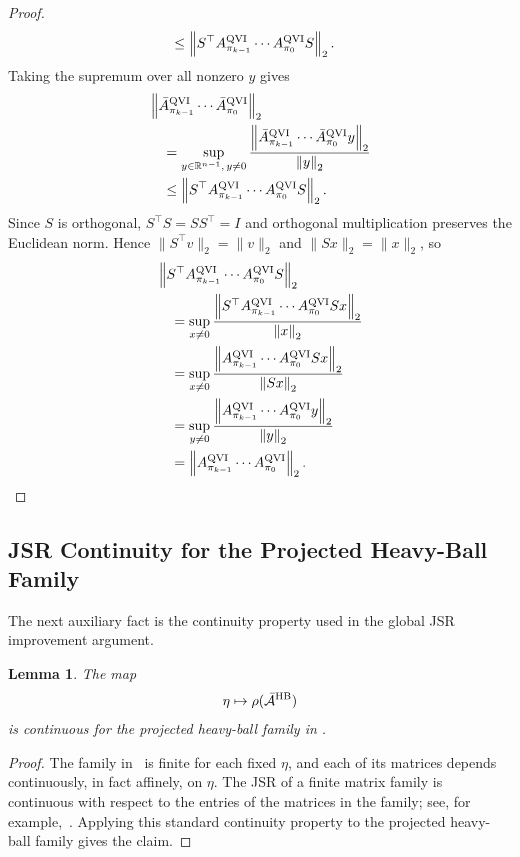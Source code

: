 \documentclass[letterpaper]{article}
\numberwithin{equation}{section}
\newtheorem{lemma}{Lemma}[section]
\newcommand{\R}{\mathbb{R}}
\begin{document}
\begin{proof}
\begin{align*}
  &\le
  \left\lVert
    S^\top A_{\pi_{k-1}}^{\rm QVI}\cdots A_{\pi_0}^{\rm QVI}S
  \right\rVert_2.
\end{align*}
Taking the supremum over all nonzero $y$ gives
\begin{align*}
&\left\lVert
    \bar A_{\pi_{k-1}}^{\rm QVI}\cdots \bar A_{\pi_0}^{\rm QVI}
  \right\rVert_2\\
&\quad=
  \sup_{y\in\R^{n-1},\,y\ne0}
  \frac{\left\lVert
    \bar A_{\pi_{k-1}}^{\rm QVI}\cdots \bar A_{\pi_0}^{\rm QVI}y
  \right\rVert_2}{\left\lVert y\right\rVert_2}\\
&\quad\le
  \left\lVert
    S^\top A_{\pi_{k-1}}^{\rm QVI}\cdots A_{\pi_0}^{\rm QVI}S
  \right\rVert_2.
\end{align*}
Since $S$ is orthogonal, $S^\top S=SS^\top=I$ and orthogonal multiplication
preserves the Euclidean norm. Hence $\|S^\top v\|_2=\|v\|_2$ and
$\|Sx\|_2=\|x\|_2$, so
\begin{align*}
&\left\lVert
  S^\top A_{\pi_{k-1}}^{\rm QVI}\cdots A_{\pi_0}^{\rm QVI}S
  \right\rVert_2\\
&\quad=\sup_{x\ne0}
  \frac{\left\lVert
  S^\top A_{\pi_{k-1}}^{\rm QVI}\cdots A_{\pi_0}^{\rm QVI}Sx
  \right\rVert_2}{\left\lVert x\right\rVert_2}\\
&\quad=\sup_{x\ne0}
  \frac{\left\lVert
  A_{\pi_{k-1}}^{\rm QVI}\cdots A_{\pi_0}^{\rm QVI}Sx
  \right\rVert_2}{\left\lVert Sx\right\rVert_2}\\
&\quad=\sup_{y\ne0}
  \frac{\left\lVert
  A_{\pi_{k-1}}^{\rm QVI}\cdots A_{\pi_0}^{\rm QVI}y
  \right\rVert_2}{\left\lVert y\right\rVert_2}\\
&\quad=\left\lVert A_{\pi_{k-1}}^{\rm QVI}\cdots A_{\pi_0}^{\rm QVI}\right\rVert_2.
\end{align*}
\end{proof}

\subsection{JSR Continuity for the Projected Heavy-Ball Family}
\label{app:projected-hb-jsr-continuity}

The next auxiliary fact is the continuity property used in the global JSR
improvement argument.
\begin{lemma}
\label{lem:projected-hb-jsr-continuity}
The map
\begin{align*}
  \eta\mapsto \rho(\bar{\mathcal A}^{\rm HB})
\end{align*}
is continuous for the projected heavy-ball family in
.
\end{lemma}
\begin{proof}
The family in~ is finite for each fixed $\eta$, and
each of its matrices depends continuously, in fact affinely, on $\eta$. The JSR
of a finite matrix family is continuous with respect to the entries of the
matrices in the family; see, for example,~\citep[Chapter~1]{jungers2009joint}.
Applying this standard continuity property to the projected heavy-ball family
gives the claim.
\end{proof}
\end{document}
